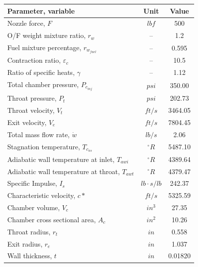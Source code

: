 \documentclass[]{aiaa-tc}%
\begin{document}
\begin{table}
\begin{center}
\begin{tabular}{| l | c | c |}

\hline
 Parameter, variable                      & Unit     & Value     \\
 \hline
 Nozzle force, $F$                        & $lbf$       & 500       \\
 O/F weight mixture ratio, $r_w$          & --  & 1.2       \\
 Fuel mixture percentage, $r_{w_{fuel}}$  & --   & 0.595      \\
 Contraction ratio, $\varepsilon_c$       & --  & 10.5      \\
 Ratio of specific heats, $\gamma$        & --  & 1.12      \\

 Total chamber pressure, $P_{c_{inj}}$    & $psi$  & 350.00    \\
 Throat pressure, $P_t$                   & $psi$       & 202.73    \\

 Throat velocity, $V_t$                   & ${ft}/{s}$    & 3464.05   \\
 Exit velocity, $V_e$                     & ${ft}/{s}$    & 7804.45   \\

 Total mass flow rate, $\dot w$           & ${lb}/{s}$    & 2.06      \\

 Stagnation temperature, $T_{c_{ns}}$             & $^\circ R$ & 5487.10   \\
 Adiabatic wall temperature at inlet, $T_{awi}$   & $^\circ R$ & 4389.64   \\
 Adiabatic wall temperature at throat, $T_{awt}$  & $^\circ R$ & 4379.47   \\

 Specific Impulse, $I_s $                 & ${lb\cdot s}/{lb}$    & 242.37    \\
 Characteristic velocity, $c*$            & ${ft}/{s}$            & 5325.59   \\

 Chamber volume, $V_c$                    & $in^3$      & 27.35     \\
 Chamber cross sectional area, $A_c$      & $in^2$      & 10.26     \\
 Throat radius, $r_t$                     & $in$        & 0.558     \\
 Exit radius, $r_e$                       & $in$        & 1.037     \\
 Wall thickness, $t$                      & $in$        & 0.01820   \\
 

\end{tabular}
\end{center}
\end{table}
\end{document}
